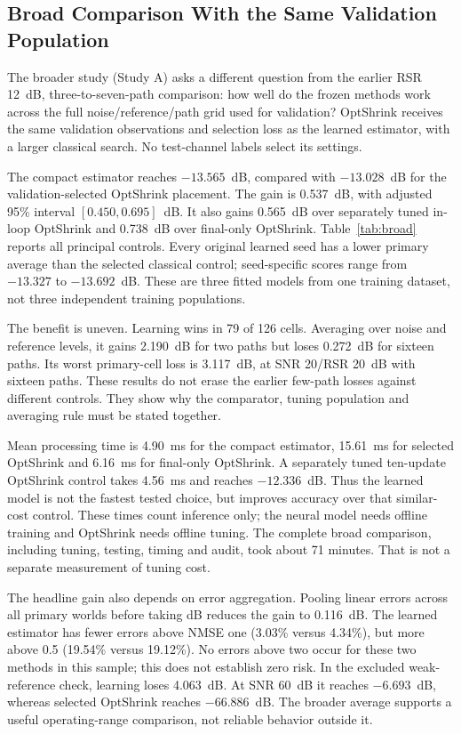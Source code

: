 \subsection{Broad Comparison With the Same Validation Population}
The broader study (Study A) asks a different question from the earlier RSR 12~dB,
three-to-seven-path comparison: how well do the frozen methods work
across the full noise/reference/path grid used for validation? OptShrink
receives the same validation observations and selection loss as the
learned estimator, with a larger classical search. No test-channel
labels select its settings.



The compact estimator reaches $-13.565$~dB, compared with $-13.028$~dB
for the validation-selected OptShrink placement. The gain is
0.537~dB, with adjusted 95\% interval $[0.450,0.695]$~dB. It also
gains 0.565~dB over separately tuned in-loop OptShrink and 0.738~dB
over final-only OptShrink. Table~\ref{tab:broad} reports all principal
controls. Every original learned seed has a lower primary average
than the selected classical control; seed-specific scores range from
$-13.327$ to $-13.692$~dB. These are three fitted models from one
training dataset, not three independent training populations.

The benefit is uneven. Learning wins in 79 of 126 cells. Averaging
over noise and reference levels, it gains 2.190~dB for two paths but
loses 0.272~dB for sixteen paths. Its worst primary-cell loss is
3.117~dB, at SNR 20/RSR 20~dB with sixteen paths. These results do
not erase the earlier few-path losses against different controls.
They show why the comparator, tuning population and averaging rule
must be stated together.

Mean processing time is 4.90~ms for the compact estimator, 15.61~ms
for selected OptShrink and 6.16~ms for final-only OptShrink. A
separately tuned ten-update OptShrink control takes 4.56~ms and
reaches $-12.336$~dB. Thus the learned model is not the fastest tested
choice, but improves accuracy over that similar-cost control. These
times count inference only; the neural model needs offline training
and OptShrink needs offline tuning. The complete broad comparison,
including tuning, testing, timing and audit, took about 71 minutes.
That is not a separate measurement of tuning cost.

The headline gain also depends on error aggregation. Pooling linear
errors across all primary worlds before taking dB reduces the gain
to 0.116~dB. The learned estimator has fewer errors above NMSE one
(3.03\% versus 4.34\%), but more above 0.5 (19.54\% versus 19.12\%).
No errors above two occur for these two methods in this sample; this
does not establish zero risk. In the excluded weak-reference check,
learning loses 4.063~dB. At SNR 60~dB it reaches $-6.693$~dB, whereas
selected OptShrink reaches $-66.886$~dB. The broader average supports
a useful operating-range comparison, not reliable behavior outside it.

